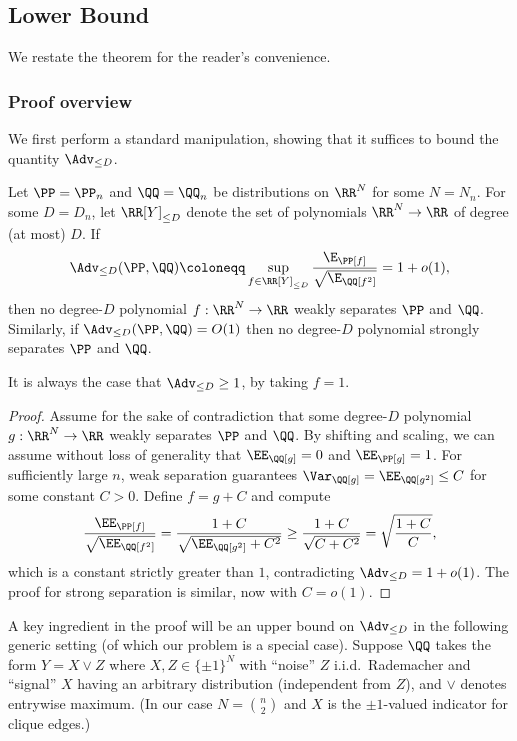 \documentclass{article}
\begin{document}
\subsection{Lower Bound}
\label{sec:pf-testing-lower}

We restate the theorem for the reader's convenience.

\thmtestinglower*

\subsubsection{Proof overview}

We first perform a standard manipulation, showing that it suffices to bound the quantity $\Adv_{\le D}$.

\begin{lemma}\label{lem:adv-sep}
Let $\PP = \PP_n$ and $\QQ = \QQ_n$ be distributions on $\RR^N$ for some $N = N_n$. For some $D = D_n$, let $\RR[Y]_{\le D}$ denote the set of polynomials $\RR^N \to \RR$ of degree (at most) $D$. If
\[ \Adv_{\le D}(\PP,\QQ) \coloneqq \sup_{f \in \RR[Y]_{\le D}} \frac{\E_\PP[f]}{\sqrt{\E_\QQ[f^2]}} = 1+o(1), \]
then no degree-$D$ polynomial $f: \RR^N \to \RR$ weakly separates $\PP$ and $\QQ$. Similarly, if $\Adv_{\le D}(\PP,\QQ) = O(1)$ then no degree-$D$ polynomial strongly separates $\PP$ and $\QQ$.
\end{lemma}

\noindent It is always the case that $\Adv_{\le D} \ge 1$, by taking $f = 1$.

\begin{proof}
Assume for the sake of contradiction that some degree-$D$ polynomial $g: \RR^N \to \RR$ weakly separates $\PP$ and $\QQ$. By shifting and scaling, we can assume without loss of generality that $\EE_\QQ[g] = 0$ and $\EE_\PP[g] = 1$. For sufficiently large $n$, weak separation guarantees $\Var_\QQ[g] = \EE_\QQ[g^2] \le C$ for some constant $C > 0$. Define $f = g + C$ and compute
\[ \frac{\EE_\PP[f]}{\sqrt{\EE_\QQ[f^2]}} = \frac{1+C}{\sqrt{\EE_\QQ[g^2]+C^2}} \ge \frac{1+C}{\sqrt{C+C^2}} = \sqrt{\frac{1+C}{C}}, \]
which is a constant strictly greater than $1$, contradicting $\Adv_{\le D} = 1+o(1)$. The proof for strong separation is similar, now with $C = o(1)$.
\end{proof}



A key ingredient in the proof will be an upper bound on $\Adv_{\le D}$ in the following generic setting (of which our problem is a special case). Suppose $\QQ$ takes the form $Y = X \vee Z$ where $X, Z \in \{\pm 1\}^N$ with ``noise'' $Z$ i.i.d.\ Rademacher and ``signal'' $X$ having an arbitrary distribution (independent from $Z$), and $\vee$ denotes entrywise maximum. (In our case $N = \binom{n}{2}$ and $X$ is the $\pm 1$-valued indicator for clique edges.)
\end{document}
